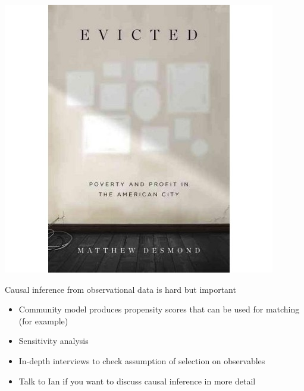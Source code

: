 \documentclass{beamer}
\begin{document}
\begin{frame}

\begin{center}
\includegraphics[height = .9\textheight]{figures/desmond_evicted_2016_cover}
\end{center}

\end{frame}
\begin{frame}

Causal inference from observational data is hard but important
\pause
\begin{itemize}
\item Community model produces propensity scores that can be used for matching (for example)
\pause
\item Sensitivity analysis
\pause
\item In-depth interviews to check assumption of selection on observables
\pause
\item Talk to Ian if you want to discuss causal inference in more detail
\end{itemize}

\end{frame}
\end{document}

